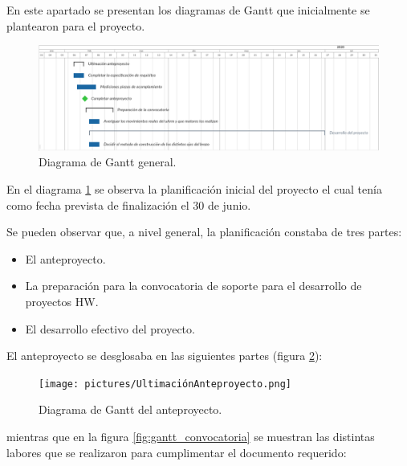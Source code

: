 En este apartado se presentan los diagramas de Gantt que inicialmente se plantearon para el proyecto.

\begin{figure}[H]
    \centering
    \includegraphics[width=\linewidth]{pictures/DiagramaGanttGeneral.png}
    \caption{Diagrama de Gantt general.}
    \label{fig:gantt_general}
\end{figure}

En el diagrama \ref{fig:gantt_general} se observa la planificación inicial del proyecto el cual tenía como fecha prevista de finalización el 30 de junio.

Se pueden observar que, a nivel general, la planificación constaba de tres partes:

\begin{itemize}
    \item El anteproyecto.
    \item La preparación para la convocatoria de soporte para el desarrollo de proyectos \ac{HW}.
    \item El desarrollo efectivo del proyecto.
\end{itemize}

El anteproyecto se desglosaba en las siguientes partes (figura \ref{fig:gantt_anteproyecto}):

\begin{figure}[H]
    \centering
    \texttt{[image: pictures/UltimaciónAnteproyecto.png]}
    \caption{Diagrama de Gantt del anteproyecto.}
    \label{fig:gantt_anteproyecto}
\end{figure}

mientras que en la figura \ref{fig:gantt_convocatoria} se muestran las distintas
labores que se realizaron para cumplimentar el documento requerido:

